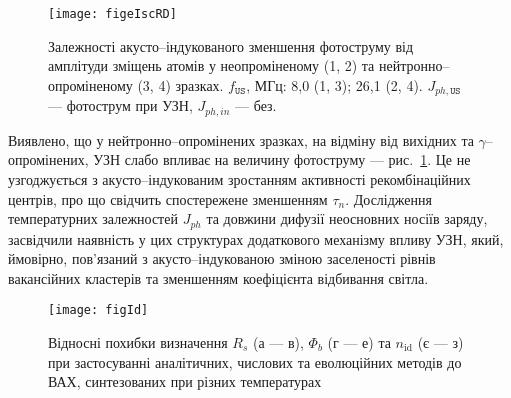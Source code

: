 \begin{figure}[ht]
\center
\texttt{[image: figeIscRD]}
\caption{\label{figeIscRD}
Залежності акусто--індукованого зменшення фотоструму від
амплітуди зміщень атомів у неопроміненому (1, 2)
та нейтронно--опроміненому (3, 4) зразках.
$f_\mathtt{US}$, МГц: 8,0 (1, 3);
26,1 (2, 4).
$J_{ph,\mathtt{US}}$ --- фотострум при УЗН,
$J_{ph,in}$ --- без.
}%
\end{figure}

Виявлено, що у нейтронно--опромінених зразках, на відміну від вихідних та  $\gamma$--опромінених, УЗН слабо впливає на величину фотоструму --- рис.~\ref{figeIscRD}.
Це не узгоджується з акусто--індукованим зростанням активності рекомбінаційних центрів, про що свідчить спостережене зменшенням $\tau_n$.
Дослідження температурних залежностей $J_{ph}$ та довжини дифузії неосновних носіїв заряду,
засвідчили наявність у цих структурах додаткового механізму впливу УЗН, який, ймовірно, пов'язаний з акусто--індукованою зміною заселеності рівнів вакансійних кластерів та зменшенням коефіцієнта відбивання світла.


\begin{figure}
\center
\texttt{[image: figId]}%
\caption{\label{figId}
Відносні похибки визначення $R_s$ (а --- в), $\Phi_b$ (г --- е) та $n_\mathrm{id}$ (є --- з)
при застосуванні аналітичних, числових та еволюційних методів до ВАХ, синтезованих при різних температурах
}
\end{figure}

